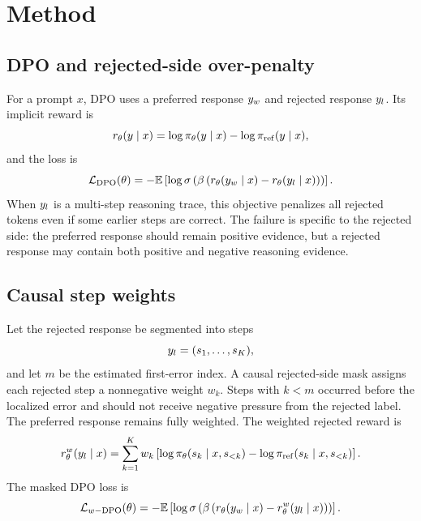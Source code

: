 \section{Method}

\subsection{DPO and rejected-side over-penalty}

For a prompt $x$, DPO uses a preferred response $y_w$ and rejected response $y_l$. Its implicit reward is
\begin{equation}
r_\theta(y \mid x) =
\log \pi_\theta(y \mid x) - \log \pi_{\mathrm{ref}}(y \mid x),
\end{equation}
and the loss is
\begin{equation}
\mathcal{L}_{\mathrm{DPO}}(\theta)
=
-\mathbb{E}\left[
\log \sigma\left(
\beta \left(r_\theta(y_w \mid x)-r_\theta(y_l \mid x)\right)
\right)
\right].
\end{equation}
When $y_l$ is a multi-step reasoning trace, this objective penalizes all rejected tokens even if some earlier steps are correct. The failure is specific to the rejected side: the preferred response should remain positive evidence, but a rejected response may contain both positive and negative reasoning evidence.

\subsection{Causal step weights}

Let the rejected response be segmented into steps
\begin{equation}
y_l = (s_1,\ldots,s_K),
\end{equation}
and let $m$ be the estimated first-error index. A causal rejected-side mask assigns each rejected step a nonnegative weight $w_k$. Steps with $k<m$ occurred before the localized error and should not receive negative pressure from the rejected label. The preferred response remains fully weighted. The weighted rejected reward is
\begin{equation}
r_\theta^w(y_l \mid x)
=
\sum_{k=1}^{K} w_k
\left[
\log \pi_\theta(s_k \mid x,s_{<k})
-
\log \pi_{\mathrm{ref}}(s_k \mid x,s_{<k})
\right].
\end{equation}
The masked DPO loss is
\begin{equation}
\mathcal{L}_{w\mathrm{-DPO}}(\theta)
=
-\mathbb{E}\left[
\log \sigma\left(
\beta \left(r_\theta(y_w \mid x)-r_\theta^w(y_l \mid x)\right)
\right)
\right].
\end{equation}

